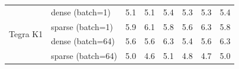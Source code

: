 \documentclass{article} %
\begin{document}
\begin{table}[h!]
\begin{tabular}{p{2.4cm}l|llllll}
\hline
\multirow{4}{*}{Tegra K1}                                                  & dense (batch=1)  & 5.1                                                   & 5.1                                                   & 5.4                                                   & 5.3                                                 & 5.3                                                 & 5.4                                                 \\
                                                                           & sparse (batch=1) & 5.9                                                   & 6.1                                                   & 5.8                                                   & 5.6                                                 & 6.3                                                 & 5.8                                                 \\
                                                                           & dense (batch=64)  & 5.6                                                   & 5.6                                                   & 6.3                                                   & 5.4                                                 & 5.6                                                 & 6.3                                                 \\
                                                                           & sparse (batch=64) & 5.0                                                     & 4.6                                                   & 5.1                                                   & 4.8                                                 & 4.7                                                 & 5.0    \\ 
                                                                           \hline
\end{tabular}
\end{table}
\end{document}
